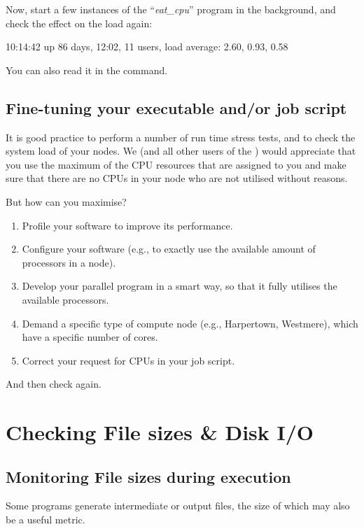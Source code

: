 Now, start a few instances of the ``\emph{eat\_cpu}'' program in the
background, and check the effect on the load again:

\begin{prompt}
10:14:42 up 86 days, 12:02, 11 users, load average: 2.60, 0.93, 0.58
\end{prompt}

You can also read it in the  command.
\subsection{Fine-tuning your executable and/or job script}

It is good practice to perform a number of run time stress tests, and to check
the system load of your nodes. We (and all other users of the \hpc) would
appreciate that you use the maximum of the CPU resources that are assigned to
you and make sure that there are no CPUs in your node who are not utilised
without reasons.

But how can you maximise?

\begin{enumerate}
\item  Profile your software to improve its performance.
\item  Configure your software (e.g., to exactly use the available amount of processors in a node).
\item  Develop your parallel program in a smart way, so that it fully utilises the available processors.
\item  Demand a specific type of compute node (e.g., Harpertown, Westmere), which have a specific number of cores.
\item  Correct your request for CPUs in your job script.
\end{enumerate}

And then check again.

\section{Checking File sizes \& Disk I/O}

\subsection{Monitoring File sizes during execution}

Some programs generate intermediate or output files, the size of which may also
be a useful metric.

